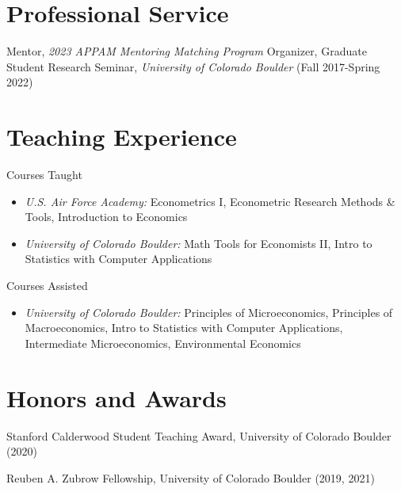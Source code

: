 \documentclass[letterpaper]{article}
\begin{document}
\section*{Professional Service}
Mentor, \textit{2023 APPAM Mentoring Matching Program}
\newline\newline
Organizer, Graduate Student Research Seminar, \textit{University of Colorado Boulder} (Fall 2017-Spring 2022)

\section*{Teaching Experience}
  Courses Taught 
  \begin{itemize}[topsep=2pt,itemsep=-1pt,leftmargin=1em]
    \item[] \textit{U.S. Air Force Academy:} Econometrics I, Econometric Research Methods \& Tools, Introduction to Economics
    \item[] \textit{University of Colorado Boulder:} Math Tools for Economists II, Intro to Statistics with Computer Applications
  \end{itemize}
  \vspace*{.5em}
	Courses Assisted
	\begin{itemize}[topsep=2pt,itemsep=-1pt,leftmargin=1em]
    \item[] \textit{University of Colorado Boulder:} Principles of Microeconomics, Principles of Macroeconomics, Intro to Statistics with Computer Applications, Intermediate Microeconomics, Environmental Economics
  \end{itemize}
\section*{Honors and Awards}
	Stanford Calderwood Student Teaching Award, University of Colorado Boulder (2020)

	Reuben A. Zubrow Fellowship, University of Colorado Boulder (2019, 2021)
\end{document}
